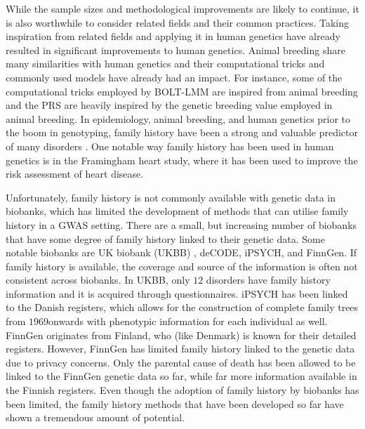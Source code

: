 While the sample sizes and methodological improvements are likely to continue, it is also worthwhile to consider related fields and their common practices. Taking inspiration from related fields and applying it in human genetics have already resulted in significant improvements to human genetics. Animal breeding share many similarities with human genetics and their computational tricks and commonly used models have already had an impact. For instance, some of the computational tricks employed by BOLT-LMM are inspired from animal breeding and the PRS are heavily inspired by the genetic breeding value employed in animal breeding\cite{loh2015efficient,wray2019complex,meuwissen2001prediction}. In epidemiology, animal breeding, and human genetics prior to the boom in genotyping, family history have been a strong and valuable predictor of many disorders \cite{guttmacher2004family,runeson2003family,collaborative2001familial,johns2001systematic}. One notable way family history has been used in human genetics is in the Framingham heart study\cite{kannel1990contribution,splansky2007third}, where it has been used to improve the risk assessment of heart disease.

Unfortunately, family history is not commonly available with genetic data in biobanks, which has limited the development of methods that can utilise family history in a GWAS setting. There are a small, but increasing number of biobanks that have some degree of family history linked to their genetic data. Some notable biobanks are UK biobank (UKBB) \cite{bycroft2018uk}, deCODE\cite{noauthor_2012-jh}, iPSYCH\cite{bybjerg2020ipsych2015}, and FinnGen\cite{Kurki2022-pt}. If family history is available, the coverage and source of the information is often not consistent across biobanks. In UKBB, only $ 12 $ disorders have family history information and it is acquired through questionnaires. iPSYCH has been linked to the Danish registers, which allows for the construction of complete family trees from $ 1969 $onwards with phenotypic information for each individual as well. FinnGen originates from Finland, who (like Denmark) is known for their detailed registers. However, FinnGen has limited family history linked to the genetic data due to privacy concerns. Only the parental cause of death has been allowed to be linked to the FinnGen genetic data so far, while far more information available in the Finnish registers. Even though the adoption of family history by biobanks has been limited, the family history methods that have been developed so far have shown a tremendous amount of potential. 

